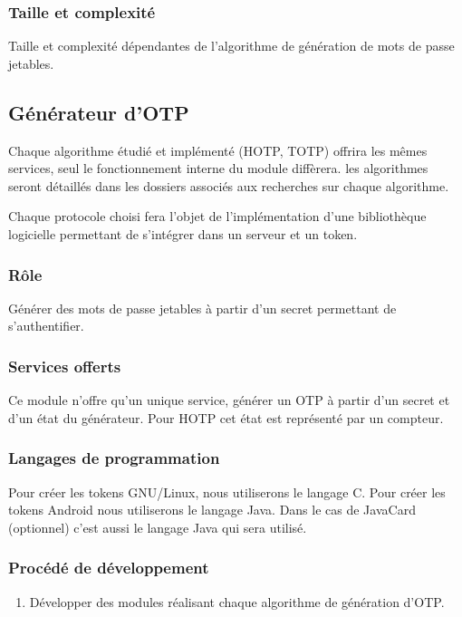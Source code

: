 \documentclass{"../../res/univ-projet"}
\begin{document}
    \subsubsection{Taille et complexité}
            Taille et complexité dépendantes de l'algorithme de génération
        de mots de passe jetables.

\subsection{Générateur d'OTP}
    Chaque algorithme étudié et implémenté (HOTP, TOTP) offrira les
    mêmes services, seul le fonctionnement interne du module diffèrera.
    les algorithmes seront détaillés dans les dossiers associés aux recherches sur 
    chaque algorithme.
    
        Chaque protocole choisi fera l'objet de l'implémentation d'une bibliothèque
    logicielle permettant de s'intégrer dans un serveur et un token.
    \subsubsection{Rôle}
        Générer des mots de passe jetables à partir d'un secret permettant
    de s'authentifier.

    \subsubsection{Services offerts}
      Ce module n'offre qu'un unique service, générer un OTP à partir d'un secret et
    d'un état du générateur. Pour HOTP cet état est représenté par un compteur.

    \subsubsection{Langages de programmation}
    Pour créer les tokens GNU/Linux, nous utiliserons le langage C.
    Pour créer les tokens Android nous utiliserons le langage Java.
    Dans le cas de JavaCard (optionnel) c'est aussi le langage Java qui sera
    utilisé.

    \subsubsection{Procédé de développement}
    \begin{enumerate}
        \item Développer des modules réalisant chaque algorithme de génération
            d'OTP.
    \end{enumerate}
\end{document}
